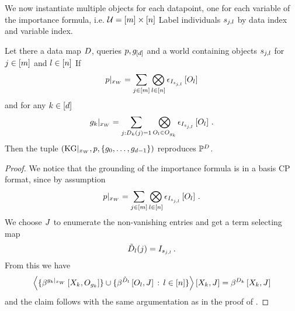 %
We now instantiate multiple objects for each datapoint, one for each variable of the importance formula, i.e. $\mathcal{U}=[m]\times[n]$
Label individuals $s_{j,l}$ by data index and variable index.

\begin{lemma}
    Let there a data map $D$, queries $p,g_{[d]}$ and a \firstOrderLogic{} world containing objects $s_{j,l}$ for $j\in[m]$ and $l\in[n]$
    If
    \begin{align*}
        {p}|_{x_{W}}
        = \sum_{j\in[m]} \bigotimes_{l\in[n]} \epsilon_{I_{s_{j,l}}}\left[O_{l}\right]
    \end{align*}
    and for any $k\in[d]$
    \begin{align*}
        {g_{k}}|_{x_{W}}
        = \sum_{j : D_{k}(j)=1} \bigotimes_{O_{l} \in O_{g_{k}}}
        \epsilon_{I_{s_{j,l}}}\left[O_{l}\right] \, .
    \end{align*}
    Then the tuple $(\mathrm{KG}|_{x_{W}},p,\{g_{0},\ldots,g_{d-1}\})$ reproduces $\mathbb{P}^{D}$.
\end{lemma}
\begin{proof}
    We notice that the grounding of the importance formula is in a basis CP format, since by assumption
    \begin{align*}
        {p}|_{x_{W}}
        = \sum_{j\in[m]} \bigotimes_{l\in[n]} \epsilon_{I_{s_{j,l}}}\left[O_{l}\right] \, .
    \end{align*}
    We choose $J$ to enumerate the non-vanishing entries and get a term selecting map
    \begin{align*}
        \tilde{D}_{l}(j) = I_{s_{j,l}} \, .
    \end{align*}
    From this we have
    \begin{align*}
        \left\langle 
            \{\beta^{{g_{k}}|_{x_{W}}}\left[X_{k},O_{g_{k}}\right]\} \cup
            \{\beta^{\tilde{D}_{l}}\left[O_{l},J\right] \, : \, l\in[n]\}
        \right\rangle \left[ X_{k},J \right]
        = \beta^{D_{k}}\left[X_{k},J\right]
    \end{align*}
    and the claim follows with the same argumentation as in the proof of .
\end{proof}


